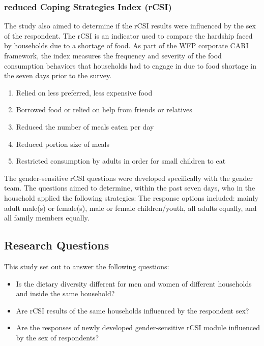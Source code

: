 \documentclass[11pt,harvard]{article}
\begin{document}
\subsubsection{reduced Coping Strategies Index (rCSI)}

The study also aimed to determine if the rCSI results were influenced by the sex of the respondent. The rCSI is an indicator used to compare the hardship faced by households due to a shortage of food. As part of the WFP corporate CARI framework, the index measures the frequency and severity of the food consumption behaviors that households had to engage in due to food shortage in the seven days prior to the survey.

\begin{enumerate}[label=\arabic*.]
	\item Relied on less preferred, less expensive food
	\item Borrowed food or relied on help from friends or relatives
	\item Reduced the number of meals eaten per day
	\item Reduced portion size of meals
	\item Restricted consumption by adults in order for small children to eat 
	
\end{enumerate}

The gender-sensitive rCSI questions were developed specifically with the gender team. The questions aimed to determine, within the past seven days, who in the household applied the following strategies: The response options included: mainly adult male(s) or female(s), male or female children/youth, all adults equally, and all family members equally.

	\pagebreak
	
\subsection{Research Questions}
This study set out to answer the following questions:
\begin{itemize}
	\item Is the dietary diversity different for men and women of different households and inside the same household?
	\item Are rCSI results of the same households influenced by the respondent sex?
	\item Are the responses of newly developed gender-sensitive rCSI module influenced by the sex of respondents?
\end{itemize}
	\pagebreak
	
\end{document}
